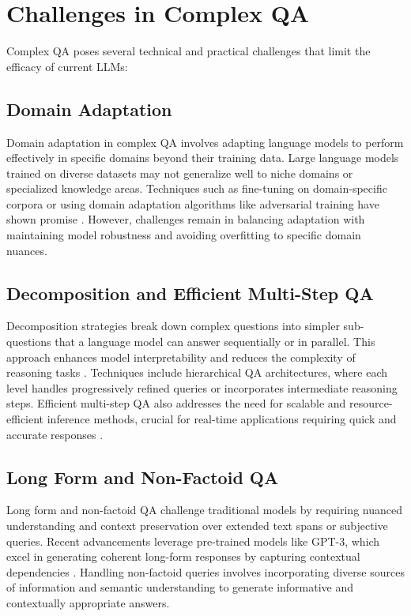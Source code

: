 \documentclass[10pt,a4paper]{article}
\begin{document}
\section{Challenges in Complex QA}
Complex QA poses several technical and practical challenges that limit the efficacy of current LLMs:

\subsection{Domain Adaptation}
Domain adaptation in complex QA involves adapting language models to perform effectively in specific domains beyond their training data. Large language models trained on diverse datasets may not generalize well to niche domains or specialized knowledge areas. Techniques such as fine-tuning on domain-specific corpora or using domain adaptation algorithms like adversarial training have shown promise \cite{pan2019adversarial}. However, challenges remain in balancing adaptation with maintaining model robustness and avoiding overfitting to specific domain nuances.


\subsection{Decomposition and Efficient Multi-Step QA}
Decomposition strategies break down complex questions into simpler sub-questions that a language model can answer sequentially or in parallel. This approach enhances model interpretability and reduces the complexity of reasoning tasks \cite{yuan2020efficient}. Techniques include hierarchical QA architectures, where each level handles progressively refined queries or incorporates intermediate reasoning steps. Efficient multi-step QA also addresses the need for scalable and resource-efficient inference methods, crucial for real-time applications requiring quick and accurate responses \cite{chen2021towards}.

\subsection{Long Form and Non-Factoid QA}
Long form and non-factoid QA challenge traditional models by requiring nuanced understanding and context preservation over extended text spans or subjective queries. Recent advancements leverage pre-trained models like GPT-3, which excel in generating coherent long-form responses by capturing contextual dependencies \cite{brown2020language}. Handling non-factoid queries involves incorporating diverse sources of information and semantic understanding to generate informative and contextually appropriate answers.
\end{document}
